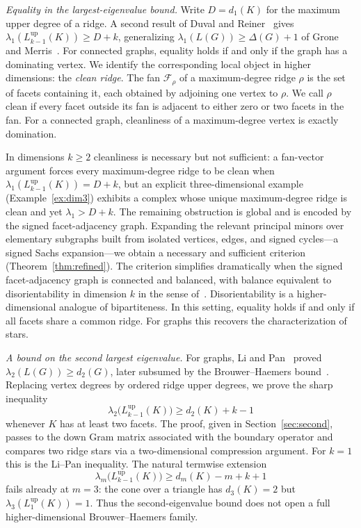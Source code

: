 \documentclass[11pt,reqno]{amsart}
\numberwithin{equation}{section}
\theoremstyle{plain}
\theoremstyle{definition}
\newcommand{\Lup}{L^{\mathrm{up}}}
\newcommand{\Fset}{\mathcal F}
\begin{document}
\smallskip
\noindent\emph{Equality in the largest-eigenvalue bound.}
Write $D=d_1(K)$ for the maximum upper degree of a ridge. A second result of Duval
and Reiner~\cite{DuvalReiner} gives $\lambda_1(\Lup_{k-1}(K))\ge D+k$, generalizing
$\lambda_1(L(G))\ge\Delta(G)+1$ of Grone and Merris~\cite{GroneMerris}. For connected
graphs, equality holds if and only if the graph has a dominating vertex. We identify
the corresponding local object in higher dimensions: the \emph{clean ridge}. The fan
$\Fset_\rho$ of a maximum-degree ridge $\rho$ is the set of facets containing it, each
obtained by adjoining one vertex to $\rho$. We call $\rho$ clean if every facet
outside its fan is adjacent to either zero or two facets in the fan. For a connected
graph, cleanliness of a maximum-degree vertex is exactly domination.

In dimensions $k\ge2$ cleanliness is necessary but not sufficient: a fan-vector
argument forces every maximum-degree ridge to be clean when
$\lambda_1(\Lup_{k-1}(K))=D+k$, but an explicit three-dimensional example
(Example~\ref{ex:dim3}) exhibits a complex whose unique maximum-degree ridge is clean
and yet $\lambda_1>D+k$. The remaining obstruction is global and is encoded by the signed
facet-adjacency graph. Expanding the relevant principal minors over elementary subgraphs
built from isolated vertices, edges, and signed cycles---a signed Sachs expansion---we obtain
a necessary and sufficient criterion (Theorem~\ref{thm:refined}). The criterion simplifies dramatically when
the signed facet-adjacency graph is connected and balanced, with balance equivalent
to disorientability in dimension $k$ in the sense of~\cite{EidiMukherjee}.
Disorientability is a higher-dimensional analogue of bipartiteness. In this setting,
equality holds if and only if all facets share a common ridge. For graphs this
recovers the characterization of stars.

\smallskip
\noindent\emph{A bound on the second largest eigenvalue.}
For graphs, Li and Pan~\cite{LiPan} proved $\lambda_2(L(G))\ge d_2(G)$, later
subsumed by the Brouwer--Haemers bound~\cite{BrouwerHaemers}. Replacing vertex
degrees by ordered ridge upper degrees, we prove the sharp inequality
\[
  \lambda_2\bigl(\Lup_{k-1}(K)\bigr)\ge d_2(K)+k-1
\]
whenever $K$ has at least two facets. The proof, given in Section~\ref{sec:second},
passes to the down Gram matrix associated with the boundary operator and compares two ridge
stars via a two-dimensional compression argument. For $k=1$ this is the Li--Pan inequality. The
natural termwise extension
\[
  \lambda_m\bigl(\Lup_{k-1}(K)\bigr)\ge d_m(K)-m+k+1
\]
fails already at $m=3$: the cone over a triangle has $d_3(K)=2$ but
$\lambda_3(\Lup_1(K))=1$. Thus the second-eigenvalue bound does not open a full
higher-dimensional Brouwer--Haemers family.
\end{document}
